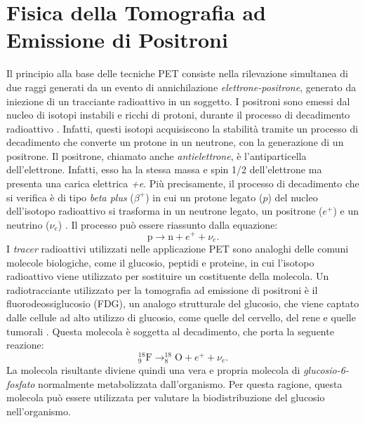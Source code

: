 \section{Fisica della Tomografia ad Emissione di Positroni}
Il principio alla base delle tecniche PET consiste nella rilevazione simultanea di due raggi \textGamma generati da un evento di annichilazione \textit{elettrone-positrone}, generato da iniezione di un tracciante radioattivo in un soggetto. I positroni sono emessi dal nucleo di isotopi instabili e ricchi di protoni, durante il processo di decadimento radioattivo \cite{Bailey2014}. Infatti, questi isotopi acquisiscono la stabilità tramite un processo di decadimento che converte un protone in un neutrone, con la generazione di un positrone. Il positrone, chiamato anche \textit{antielettrone}, è l'antiparticella dell'elettrone. Infatti, esso ha la stessa massa e spin 1/2 dell'elettrone ma presenta una carica elettrica \textit{+e}. Più precisamente, il processo di decadimento che si verifica è di tipo \textit{beta plus} ($\beta^+$) in cui un protone legato ($p$) del nucleo dell'isotopo radioattivo si trasforma in un neutrone legato, un positrone ($e^+$) e un neutrino ($\nu_e$) \cite{Betaplus}. Il processo può essere riassunto dalla equazione:
\begin{equation}
	\text{p}\to \text{n} + e^+ + \nu_e.
\end{equation}
I \textit{tracer} radioattivi utilizzati nelle applicazione PET sono analoghi delle comuni molecole biologiche, come il glucosio, peptidi e proteine, in cui l'isotopo radioattivo viene utilizzato per sostituire un costituente della molecola. Un radiotracciante utilizzato per la tomografia ad emissione di positroni è il fluorodeossiglucosio (FDG), un analogo strutturale del glucosio, che viene captato dalle cellule ad alto utilizzo di glucosio, come quelle del cervello, del rene e quelle tumorali \cite{FDG}. Questa molecola è soggetta al decadimento, che porta la seguente reazione:
\begin{equation}
	^{18}_9\text{F}\to ^{18}_8\text{O} + e^+ + \nu_e.
\end{equation}
La molecola risultante diviene quindi una vera e propria molecola di \textit{glucosio-6-fosfato} normalmente metabolizzata dall'organismo. Per questa ragione, questa molecola può essere utilizzata per valutare la biodistribuzione del glucosio nell'organismo.


